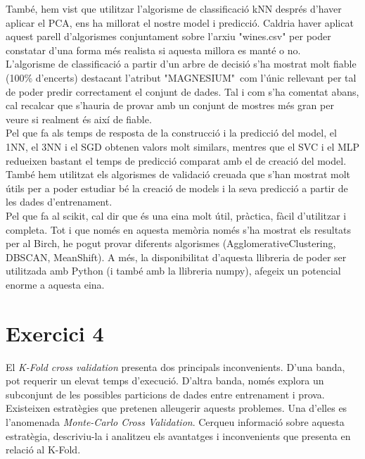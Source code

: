 \documentclass{article} %
\begin{document}
{	També, hem vist que utilitzar l'algorisme de classificació kNN després d'haver aplicar el PCA, ens ha millorat el nostre model i predicció. Caldria haver aplicat aquest parell d'algorismes conjuntament sobre l'arxiu "wines.csv" per poder constatar d'una forma més realista si aquesta millora es manté o no. \\

	L'algorisme de classificació a partir d'un arbre de decisió s'ha mostrat molt fiable (100\% d'encerts) destacant l'atribut "MAGNESIUM"\ com l'únic rellevant per tal de poder predir correctament el conjunt de dades. Tal i com s'ha comentat abans, cal recalcar que s'hauria de provar amb un conjunt de mostres més gran per veure si realment és així de fiable. \\

	Pel que fa als temps de resposta de la construcció i la predicció del model, el 1NN, el 3NN i el SGD obtenen valors molt similars, mentres que el SVC i el MLP redueixen bastant el temps de predicció comparat amb el de creació del model. \\

	També hem utilitzat els algorismes de validació creuada que s'han mostrat molt útils per a poder estudiar bé la creació de models i la seva predicció a partir de les dades d'entrenament. \\

	Pel que fa al scikit, cal dir que és una eina molt útil, pràctica, fàcil d'utilitzar i completa. Tot i que només en aquesta memòria només s'ha mostrat els resultats per al Birch, he pogut provar diferents algorismes (AgglomerativeClustering, DBSCAN, MeanShift). A més, la disponibilitat d'aquesta llibreria de poder ser utilitzada amb Python (i també amb la llibreria numpy), afegeix un potencial enorme a aquesta eina. \\
}

\section{Exercici 4}
El \textit{K-Fold cross validation} presenta dos principals inconvenients. D'una banda, pot requerir un elevat temps d'execució. D'altra banda, només explora un subconjunt de les possibles particions de dades entre entrenament i prova. Existeixen estratègies que pretenen alleugerir aquests problemes. Una d'elles es l'anomenada \textit{Monte-Carlo Cross Validation}. Cerqueu informació sobre aquesta estratègia, descriviu-la i analitzeu els avantatges i inconvenients que presenta en relació al K-Fold.
\\
\end{document}
